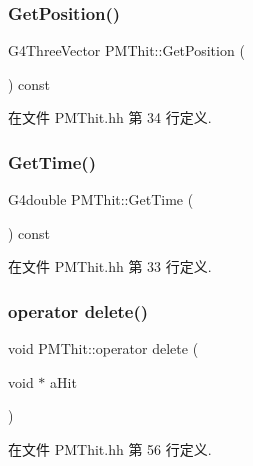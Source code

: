 \subsubsection{\texorpdfstring{Get\+Position()}{GetPosition()}}
{\footnotesize\ttfamily G4\+Three\+Vector P\+M\+Thit\+::\+Get\+Position (\begin{DoxyParamCaption}{ }\end{DoxyParamCaption}) const\hspace{0.3cm}{\ttfamily [inline]}}



在文件 P\+M\+Thit.\+hh 第 34 行定义.

\mbox{\label{classPMThit_a0a9e1a55de9a3964babad3a5f81ad5bb}} 
\subsubsection{\texorpdfstring{Get\+Time()}{GetTime()}}
{\footnotesize\ttfamily G4double P\+M\+Thit\+::\+Get\+Time (\begin{DoxyParamCaption}{ }\end{DoxyParamCaption}) const\hspace{0.3cm}{\ttfamily [inline]}}



在文件 P\+M\+Thit.\+hh 第 33 行定义.

\mbox{\label{classPMThit_a9f05cc06463bd5855188f47bcb8d36ee}} 
\subsubsection{\texorpdfstring{operator delete()}{operator delete()}}
{\footnotesize\ttfamily void P\+M\+Thit\+::operator delete (\begin{DoxyParamCaption}\item[{void $\ast$}]{a\+Hit }\end{DoxyParamCaption})\hspace{0.3cm}{\ttfamily [inline]}}



在文件 P\+M\+Thit.\+hh 第 56 行定义.

\mbox{\label{classPMThit_a3a8f22237500cbebd0232e95c75d1983}} 
